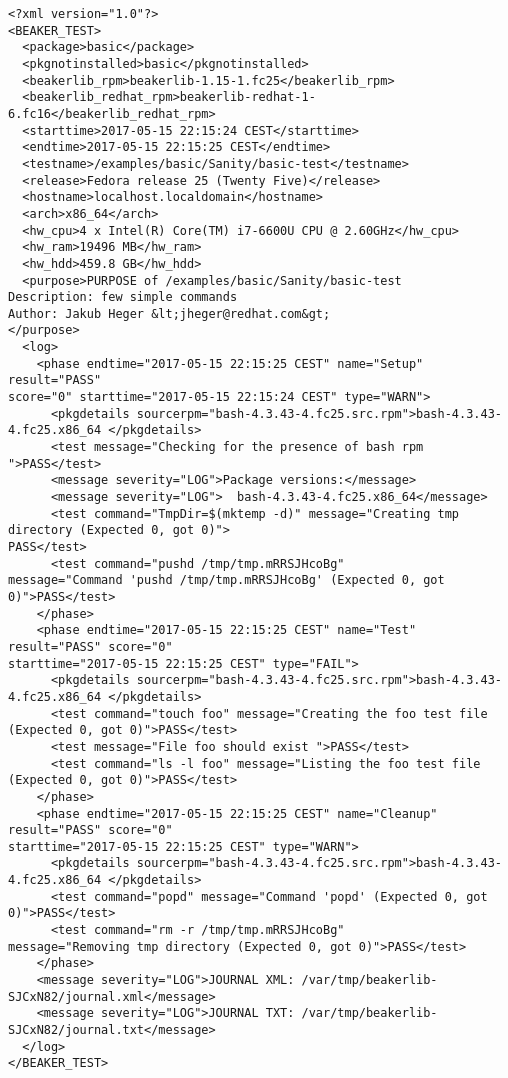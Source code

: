 \begin{minipage}{\linewidth}
\begin{lstlisting}[style=xml_journal,caption={Example of journal.xml},label={lst:journalxml_example}]
<?xml version="1.0"?>
<BEAKER_TEST>
  <package>basic</package>
  <pkgnotinstalled>basic</pkgnotinstalled>
  <beakerlib_rpm>beakerlib-1.15-1.fc25</beakerlib_rpm>
  <beakerlib_redhat_rpm>beakerlib-redhat-1-6.fc16</beakerlib_redhat_rpm>
  <starttime>2017-05-15 22:15:24 CEST</starttime>
  <endtime>2017-05-15 22:15:25 CEST</endtime>
  <testname>/examples/basic/Sanity/basic-test</testname>
  <release>Fedora release 25 (Twenty Five)</release>
  <hostname>localhost.localdomain</hostname>
  <arch>x86_64</arch>
  <hw_cpu>4 x Intel(R) Core(TM) i7-6600U CPU @ 2.60GHz</hw_cpu>
  <hw_ram>19496 MB</hw_ram>
  <hw_hdd>459.8 GB</hw_hdd>
  <purpose>PURPOSE of /examples/basic/Sanity/basic-test
Description: few simple commands
Author: Jakub Heger &lt;jheger@redhat.com&gt;
</purpose>
  <log>
    <phase endtime="2017-05-15 22:15:25 CEST" name="Setup" result="PASS"
score="0" starttime="2017-05-15 22:15:24 CEST" type="WARN">
      <pkgdetails sourcerpm="bash-4.3.43-4.fc25.src.rpm">bash-4.3.43-4.fc25.x86_64 </pkgdetails>
      <test message="Checking for the presence of bash rpm ">PASS</test>
      <message severity="LOG">Package versions:</message>
      <message severity="LOG">  bash-4.3.43-4.fc25.x86_64</message>
      <test command="TmpDir=$(mktemp -d)" message="Creating tmp directory (Expected 0, got 0)">
PASS</test>
      <test command="pushd /tmp/tmp.mRRSJHcoBg" 
message="Command 'pushd /tmp/tmp.mRRSJHcoBg' (Expected 0, got 0)">PASS</test>
    </phase>
    <phase endtime="2017-05-15 22:15:25 CEST" name="Test" result="PASS" score="0" 
starttime="2017-05-15 22:15:25 CEST" type="FAIL">
      <pkgdetails sourcerpm="bash-4.3.43-4.fc25.src.rpm">bash-4.3.43-4.fc25.x86_64 </pkgdetails>
      <test command="touch foo" message="Creating the foo test file (Expected 0, got 0)">PASS</test>
      <test message="File foo should exist ">PASS</test>
      <test command="ls -l foo" message="Listing the foo test file (Expected 0, got 0)">PASS</test>
    </phase>
    <phase endtime="2017-05-15 22:15:25 CEST" name="Cleanup" result="PASS" score="0" 
starttime="2017-05-15 22:15:25 CEST" type="WARN">
      <pkgdetails sourcerpm="bash-4.3.43-4.fc25.src.rpm">bash-4.3.43-4.fc25.x86_64 </pkgdetails>
      <test command="popd" message="Command 'popd' (Expected 0, got 0)">PASS</test>
      <test command="rm -r /tmp/tmp.mRRSJHcoBg" 
message="Removing tmp directory (Expected 0, got 0)">PASS</test>
    </phase>
    <message severity="LOG">JOURNAL XML: /var/tmp/beakerlib-SJCxN82/journal.xml</message>
    <message severity="LOG">JOURNAL TXT: /var/tmp/beakerlib-SJCxN82/journal.txt</message>
  </log>
</BEAKER_TEST>
\end{lstlisting}
\end{minipage}

